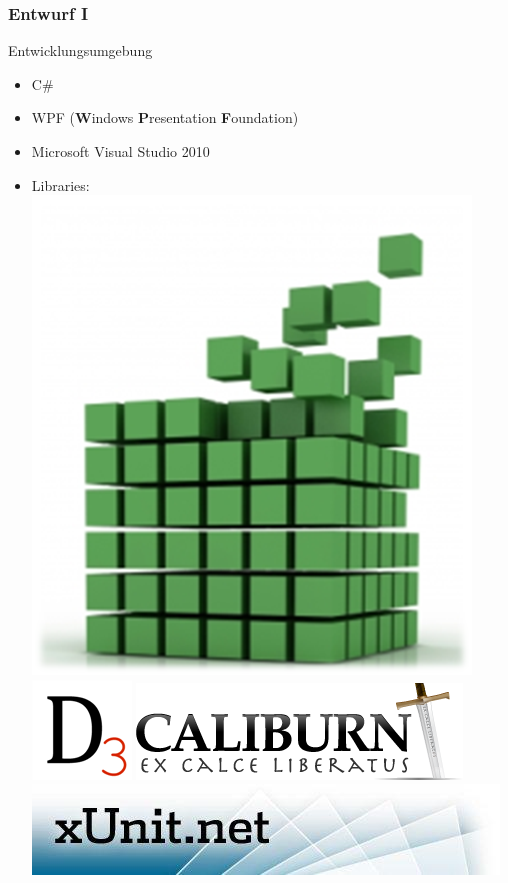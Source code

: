 \documentclass[t]{beamer}
\begin{document}
\begin{frame}
	\frametitle{Entwurf I}
	
	Entwicklungsumgebung ~\\
	\begin{itemize}
		\item<+-> C\#
		\item<+-> WPF (\textbf{W}indows \textbf{P}resentation \textbf{F}oundation)
		\item<+-> Microsoft Visual Studio 2010
        \item<+-> Libraries:
            \pause
            \includegraphics[scale=0.1]{img/mef}
            \includegraphics[scale=0.4]{img/d3}
            \includegraphics[scale=0.3]{img/caliburn}
            \includegraphics[scale=0.3]{img/xunit} ~\\

\end{itemize}
\end{frame}
\end{document}
